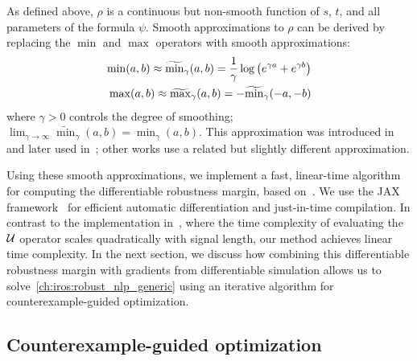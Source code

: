 As defined above, $\rho$ is a continuous but non-smooth function of $s$, $t$, and all parameters of the formula $\psi$. Smooth approximations to $\rho$ can be derived by replacing the $\min$ and $\max$ operators with smooth approximations:
\begin{align}
    \min(a, b) \approx \widetilde{\min}_\gamma(a, b) = \frac{1}{\gamma} \log\left( e^{\gamma a} + e^{\gamma b} \right) \label{ch:iros:smooth_min} \\
    \max(a, b) \approx \widetilde{\max}_\gamma(a, b) = -\widetilde{\min}_{\gamma}(-a, -b) \label{ch:iros:smooth_max}
\end{align}
where $\gamma > 0$ controls the degree of smoothing; $\lim_{\gamma \to \infty} \widetilde{\min}_\gamma(a, b) = \min_\gamma(a, b)$. This approximation was introduced in~\cite{pantSmoothOperatorControl2017} and later used in~\cite{pantFlybyLogicControlMultiDrone2018,pantazidesSatelliteMissionPlanning2022}; other works \cite{leungBackPropagationSignalTemporal2021} use a related but slightly different approximation.

Using these smooth approximations, we implement a fast, linear-time algorithm for computing the differentiable robustness margin, based on~\cite{donzeEfficientRobustMonitoring2013a}. We use the JAX framework~\cite{jax2018github} for efficient automatic differentiation and just-in-time compilation. In contrast to the implementation in~\cite{leungBackPropagationSignalTemporal2021}, where the time complexity of evaluating the $\mathcal{U}$ operator scales quadratically with signal length, our method achieves linear time complexity. In the next section, we discuss how combining this differentiable robustness margin with gradients from differentiable simulation allows us to solve~\eqref{ch:iros:robust_nlp_generic} using an iterative algorithm for counterexample-guided optimization.

\subsection{Counterexample-guided optimization}\label{ch:iros:cego}

